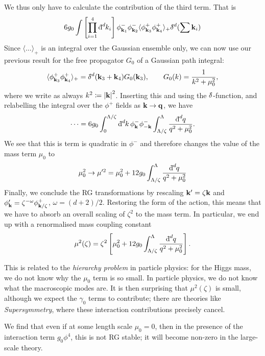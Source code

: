 We thus only have to calculate the contribution of the third term. That is
\begin{equation}
  6 g_0 \int \left[ \prod_{i=1}^4 \bdd[d]{k_i} \right] \phi^-_{\vb{k}_1} \phi^-_{\vb{k}_2} \langle \phi^+_{\vb{k}_3}\phi^+_{\vb{k}_4} \rangle_+ \bdelta^d (\sum \vb{k}_i)
\end{equation}
Since $\langle \dots \rangle_+$ is an integral over the Gaussian ensemble only, we can now use our previous result for the free propagator $G_0$ of a Gaussian path integral:
\begin{equation}
  \langle \phi^+_{\vb{k}_3}\phi^+_{\vb{k}_4} \rangle_+ = \bdelta^d(\vb{k}_3 + \vb{k}_4) G_0 (\vb{k}_3), \qquad G_0(k) = \frac{1}{k^2 + \mu_0^2},
\end{equation}
where we write as always $k^2 \coloneqq \abs{\vb{k}}^2$.
Inserting this and using the $\bdelta$-function, and relabelling the integral over the $\phi^+$ fields as $\vb{k} \to \vb{q}$, we have
\begin{equation}
  \dots = 6g_0 \int_0^{\Lambda/\zeta} \bdd[d]{k} \phi^-_{\vb{k}}\phi^-_{-\vb{k}} \int_{\Lambda/\zeta}^{\Lambda} \frac{\bdd[d]{q}}{q^2 + \mu_0^2}.
\end{equation}
We see that this is term is quadratic in $\phi^-$ and therefore changes the value of the mass term $\mu_0$ to 
\begin{equation}
  \mu_0^2 \to \mu'^2 = \mu_0^2+ 12 g_0 \int_{\Lambda/\zeta}^{\Lambda} \frac{\bdd[d]{q}}{q^2 + \mu_0^2}
\end{equation}
Finally, we conclude the RG transformations by rescaling $\vb{k}' = \zeta \vb{k}$ and $\phi'_{\vb{k}} = \zeta^{-\omega} \phi^+_{\vb{k}/\zeta}$, $\omega = (d+2)/2$. Restoring the form of the action, this means that we have to absorb an overall scaling of $\zeta^2$ to the mass term. In particular, we end up with a renormalised mass coupling constant
\begin{equation}
  \mu^2(\zeta) = \zeta^2 \left[ \mu^2_0 + 12 g_0 \int_{\Lambda/\zeta}^{\Lambda} \frac{\bdd[d]{q}}{q^2 + \mu_0^2} \right].
\end{equation}
\begin{leftbar}
  \begin{remark}
    This is related to the \emph{hierarchy problem} in particle physics: for the Higgs mass, we do not know why the $\mu_0$ term is so small.
    In particle physics, we do not know what the macroscopic modes are. It is then surprising that $\mu^2(\zeta)$ is small, although we expect the $\gamma_0$ terms to contribute; there are theories like \emph{Supersymmetry}, where these interaction contributions precisely cancel.
  \end{remark}
\end{leftbar}
We find that even if at some length scale $\mu_0 = 0$, then in the presence of the interaction term $g_0 \phi^4$, this is not RG stable; it will become non-zero in the large-scale theory.

